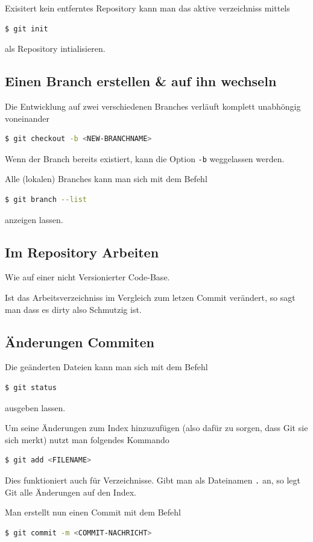 \documentclass[landscape,a4paper]{cheatsheet}
\newcommand{\highlight}[1]{{\textsf{\color{primaryColor}#1}}}
\begin{document}
Exisitert kein entferntes Repository kann man das aktive
verzeichniss mittels
\begin{lstlisting}[language=bash]
  $ git init
\end{lstlisting} %
als Repository intialisieren.
\subsection{Einen \highlight{Branch} erstellen \& auf ihn wechseln}
Die Entwicklung auf zwei verschiedenen Branches verläuft komplett
unabhöngig voneinander
\begin{lstlisting}[language=bash]
  $ git checkout -b <NEW-BRANCHNAME>
\end{lstlisting} %
Wenn der Branch bereits existiert, kann die Option \lstinline{-b}
weggelassen werden.

Alle (lokalen) Branches kann man sich mit dem Befehl
\begin{lstlisting}[language=bash]
  $ git branch --list
\end{lstlisting} %
anzeigen lassen.
\subsection{Im Repository Arbeiten}
Wie auf einer nicht Versionierter Code-Base.

Ist das Arbeitsverzeichniss im Vergleich zum letzen Commit verändert,
so sagt man dass es \highlight{dirty}  also Schmutzig ist.
\subsection{Änderungen \highlight{Commiten}}
Die geänderten Dateien kann man sich mit dem Befehl 
\begin{lstlisting}[language=bash]
  $ git status
\end{lstlisting} %
ausgeben lassen.

Um seine Änderungen zum \highlight{Index} hinzuzufügen (also dafür zu
sorgen, dass Git sie sich merkt) nutzt man folgendes Kommando
\begin{lstlisting}[language=bash]
  $ git add <FILENAME>
\end{lstlisting} %
Dies funktioniert auch für Verzeichnisse. Gibt man als Dateinamen
\lstinline{.} an, so legt Git alle Änderungen auf den Index.

Man erstellt nun einen \highlight{Commit} mit dem Befehl 
\begin{lstlisting}[language=bash]
  $ git commit -m <COMMIT-NACHRICHT>
\end{lstlisting} %
\end{document}
